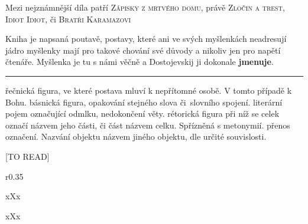\documentclass{extarticle} %
\begin{document}

\noindent 
Mezi nejznámnější díla patří \textsc{Zápisky z mrtvého domu}, právě \textsc{Zločin a trest}, \textsc{Idiot Idiot}, či \textsc{Bratři Karamazovi}






\noindent 
Kniha je napsaná poutavě, postavy, které ani ve svých myšlenkách neadresují jádro myšlenky mají pro takové chování své důvody a nikoliv jen pro napětí čtenáře.
Myšlenka je tu s námi věčně a Dostojevskij ji dokonale \textbf{jmenuje}.

\vfill

\noindent\begin{minipage}{\textwidth}
    {\textcolor{\wpagecolor}{\rule{\linewidth}{0.4pt}}
    \footnotesize
     řečnická figura, ve které postava mluví k nepřítomné osobě.
    V tomto případě k Bohu.
     básnická figura, opakování stejného slova či~slovního spojení. 
     literární pojem označující odmlku, nedokončení věty.
     rétorická figura při níž se celek označí názvem jeho části, či část názvem celku.
    Spřízněná s metonymií.
     přenos označení.
    Nazvání objektu názvem jiného objektu, dle určité souvislosti.
    }
\end{minipage}

\newpage


\changefontsize{8pt}

[TO READ]

\noindent\begin{wrapfigure}{r}{0.35\textwidth}
\tiny

\setlength{\parindent}{3pt}
xXx
\end{wrapfigure}


\noindent xXx

\end{document}
